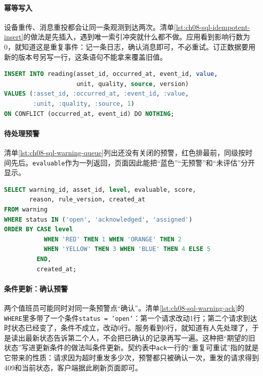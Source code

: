 \paragraph{幂等写入}设备重传、消息重投都会让同一条观测到达两次。清单\ref{lst:ch08-sql-idempotent-insert}的做法是先插入，遇到唯一索引冲突就什么都不做。应用看到影响行数为0，就知道这是重复事件：记一条日志，确认消息即可，不必重试。订正数据要用新的版本号另写一行，这条语句不能拿来覆盖旧值。

\begin{lstlisting}[label={lst:ch08-sql-idempotent-insert},language=SQL,caption={基于事件 ID 的幂等写入}]
INSERT INTO reading(asset_id, occurred_at, event_id, value,
                    unit, quality, source, version)
VALUES (:asset_id, :occurred_at, :event_id, :value,
        :unit, :quality, :source, 1)
ON CONFLICT (occurred_at, event_id) DO NOTHING;
\end{lstlisting}

\paragraph{待处理预警}清单\ref{lst:ch08-sql-warning-queue}列出还没有关闭的预警，红色排最前，同级按时间先后。\texttt{evaluable}作为一列返回，页面因此能把“蓝色”“无预警”和“未评估”分开显示。

\begin{lstlisting}[label={lst:ch08-sql-warning-queue},language=SQL,caption={待处理预警队列查询}]
SELECT warning_id, asset_id, level, evaluable, score,
       reason, rule_version, created_at
FROM warning
WHERE status IN ('open', 'acknowledged', 'assigned')
ORDER BY CASE level
           WHEN 'RED' THEN 1 WHEN 'ORANGE' THEN 2
           WHEN 'YELLOW' THEN 3 WHEN 'BLUE' THEN 4 ELSE 5
         END,
         created_at;
\end{lstlisting}

\paragraph{条件更新：确认预警}两个值班员可能同时对同一条预警点“确认”。清单\ref{lst:ch08-sql-warning-ack}的\texttt{WHERE}里多带了一个条件\texttt{status = 'open'}：第一个请求改动1行；第二个请求到达时状态已经变了，条件不成立，改动0行。服务看到0行，就知道有人先处理了，于是读出最新状态告诉第二个人，不会把已确认的记录再写一遍。这种把“期望的旧状态”写进更新条件的做法叫条件更新。契约表中\texttt{ack}一行的“重复可重试”指的就是它带来的性质：请求因为超时重发多少次，预警都只被确认一次，重发的请求得到409和当前状态，客户端据此刷新页面即可。

